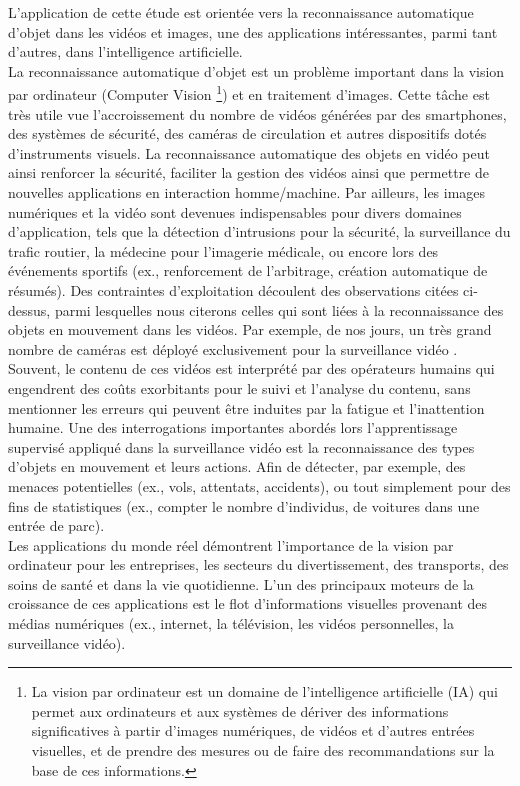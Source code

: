 		L’application de cette étude est orientée vers la reconnaissance automatique d'objet dans les vidéos et images, une des applications intéressantes, parmi tant d'autres, dans l'intelligence artificielle.\\
		La reconnaissance automatique d'objet est un problème important dans la vision par ordinateur (Computer Vision 
			\footnote{La vision par ordinateur est un domaine de l'intelligence artificielle (IA) qui permet aux ordinateurs et aux systèmes de dériver des informations significatives à partir d'images numériques, de vidéos et d'autres entrées visuelles, et de prendre des mesures ou de faire des recommandations sur la base de ces informations.}) 
		et en traitement d'images. Cette tâche est très utile vue l'accroissement du nombre de vidéos générées par des smartphones, des systèmes de sécurité, des caméras de circulation et autres dispositifs dotés d'instruments visuels. La reconnaissance automatique des objets en vidéo peut ainsi renforcer la sécurité, faciliter la gestion des vidéos ainsi que permettre de nouvelles applications en interaction homme/machine.	
		Par ailleurs, les images numériques et la vidéo sont devenues indispensables pour divers domaines d'application, tels que la détection d'intrusions pour la sécurité, la surveillance du trafic routier, la médecine pour l'imagerie médicale, ou encore lors des événements sportifs (ex., renforcement de l'arbitrage, création automatique de résumés).
		Des contraintes d'exploitation découlent des observations citées ci-dessus, parmi lesquelles nous citerons celles qui sont liées à la reconnaissance des objets en mouvement dans les vidéos. Par exemple, de nos jours, un très grand nombre de caméras est déployé exclusivement pour la surveillance vidéo \cite{ahadjitse2013reconnaissance} . 
		Souvent, le contenu de ces vidéos est interprété par des opérateurs humains qui engendrent des coûts exorbitants pour le suivi et l'analyse du contenu, sans mentionner les erreurs qui peuvent être induites par la fatigue et l'inattention humaine. 
		Une des interrogations importantes abordés lors  l'apprentissage supervisé appliqué dans la surveillance vidéo est la reconnaissance des types d'objets en mouvement et leurs actions. Afin de détecter, par exemple, des menaces potentielles (ex., vols, attentats, accidents), ou tout simplement pour des fins de statistiques (ex., compter le nombre d'individus, de voitures dans une entrée de parc).\\	
		Les applications du monde réel démontrent l'importance de la vision par ordinateur pour les entreprises, les secteurs du divertissement, des transports, des soins de santé et dans la vie quotidienne. L'un des principaux moteurs de la croissance de ces applications est le flot d'informations visuelles provenant des médias numériques (ex., internet, la télévision, les vidéos personnelles, la surveillance vidéo). 
		
